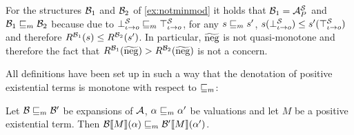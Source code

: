 \documentclass[a4paper,twoside,notitlepage,openright,11pt]{report}
\begin{document}
\begin{example}
  For the structures $\mathcal B_1$ and $\mathcal B_2$ of \cref{ex:notminmod} it holds that $\mathcal B_1=\mathcal A_P^\mathcal S$ and $\mathcal B_1\sqsubseteq_m\mathcal B_2$ because due to $\bot_{\iota\to o}^\mathcal S\sqsubseteq_m\top_{\iota\to o}^\mathcal S$, for any $s\sqsubseteq_m s'$, $s(\bot_{\iota\to o}^\mathcal S)\leq s'(\top_{\iota\to o}^\mathcal S)$ and therefore $R^{\mathcal B_1}(s)\leq R^{\mathcal B_2}(s')$. In particular, $\widetilde{\operatorname{neg}}$ is not quasi-monotone and therefore the fact that $R^{\mathcal B_1}(\widetilde{\operatorname{neg}})>R^{\mathcal B_2}(\widetilde{\operatorname{neg}})$ is not a concern.
\end{example}
All definitions have been set up in such a way that the denotation of positive existential terms is monotone with respect to $\sqsubseteq_m$:
\begin{proposition}
  \label{lem:termmon}
  Let $\mathcal B\sqsubseteq_m\mathcal B'$ be expansions of $\mathcal A$, $\alpha\sqsubseteq_m\alpha'$ be valuations and let $M$ be a positive existential term.
  Then ${\mathcal B}\llbracket M\rrbracket(\alpha)\sqsubseteq_m{\mathcal B'}\llbracket M\rrbracket(\alpha')$.
\end{proposition}
\end{document}
